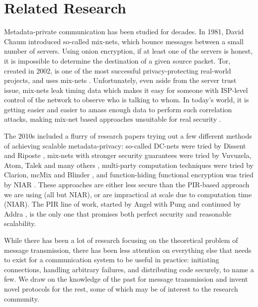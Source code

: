 \section{Related Research}

Metadata-private communication has been studied for decades. In 1981, David Chaum introduced so-called mix-nets, which bounce messages between a small number of servers. Using onion encryption, if at least one of the servers is honest, it is impossible to determine the destination of a given source packet. Tor, created in 2002, is one of the most successful privacy-protecting real-world projects, and uses mix-nets \cite{dingledine2004tor}. Unfortunately, even aside from the server trust issue, mix-nets leak timing data which makes it easy for someone with ISP-level control of the network to observe who is talking to whom. In today's world, it is getting easier and easier to amass enough data to perform such correlation attacks, making mix-net based approaches unsuitable for real security \cite{karunanayake2021anonymisation}.

The 2010s included a flurry of research papers trying out a few different methods of achieving scalable metadata-privacy: so-called DC-nets were tried by Dissent and Riposte \cite{corrigan2010dissent,corrigan2015riposte}, mix-nets with stronger security guarantees were tried by Vuvuzela, Atom, Talek and many others \cite{van2015vuvuzela,cheng2020talek,kwon2017atom}, multi-party computation techniques were tried by Clarion, mcMix and Blinder \cite{alexopoulos2017mcmix,eskandarian2021clarion,abraham2020blinder}, and function-hiding functional encryption was tried by NIAR \cite{shi2021non,bunz2021non}. These approaches are either less secure than the PIR-based approach we are using (all but NIAR), or are impractical at scale due to computation time (NIAR). The PIR line of work, started by Angel with Pung \cite{angel2016unobservable,angel2018pir} and continued by Addra \cite{ahmad2021addra}, is the only one that promises both perfect security and reasonable scalability.

While there has been a lot of research focusing on the theoretical problem of message transmission, there has been less attention on everything else that needs to exist for a communication system to be useful in practice: initiating connections, handling arbitrary failures, and distributing code securely, to name a few. We draw on the knowledge of the past for message transmission and invent novel protocols for the rest, some of which may be of interest to the research community.